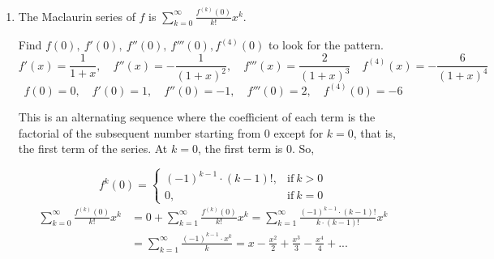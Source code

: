 \documentclass[a4paper, 12pt]{article}
\begin{document}
\begin{enumerate}[leftmargin=*,label=\textbf{\arabic*.}]
Apply integration by parts and then evaluate the improper integrals by taking the limit.
\[\left.\begin{array}{c}
u=x\implies du=dv\\[1em]
dv= e^{-x}\,dx\implies v=- e^{-x}
\end{array}\right\}\rightarrow \int u\,dv=uv-\int v\,du\]
\vspace{-1em}
\begin{align*}\int_1^{\infty}x e^{-x}\,dx&=\lim_{R\to\infty}\left[-x e^{-x}\right]_1^R-\lim_{P\to\infty}\int_1^P- e^{-x}\,dx=\lim_{R\to\infty}\left[-x e^{-x}\right]_1^R-\lim_{P\to\infty} e^{-x}\bigg|_1^P\\[1em]&=\lim_{R\to\infty}\left(-R e^{-R}+ e^{-1}\right)-\lim_{P\to\infty}\left( e^{-P}- e^{-1}\right)=\lim_{R\to\infty}\left(-R e^{-R}\right)+2 e^{-1}\end{align*}

To evaluate the limit, we assume that $-R e^{-R}$ is a function of $R$. After that, put the expression in a form that we can apply L'Hôpital's rule in order to eliminate the form $\infty/\infty$.
\[\lim_{R\to\infty}\left(-R e^{-R}\right)=\lim_{R\to\infty}\frac{-R}{\frac1{ e^{-R}}}\overset{\text{L'H.}}{=}\lim_{R\to\infty}\frac1{\frac{1}{ e^{-2R}}\cdot\left(- e^{-R}\right)}=\lim_{R\to\infty}\left(- e^{-R}\right)=0\]

Since the integral converges to $2 e^{-1}$, the series $\displaystyle\sum_{k=1}^{\infty}k e^{-k}$ also converges. The first term of the series in the original question is $0\cdot e^0=0$. The sum of a convergent series and a finite number is still finite. Therefore, the sum $\displaystyle\sum_{k=0}^{\infty}k e^{-k}$ converges.

\item The Maclaurin series of $f$ is $\displaystyle\sum_{k=0}^{\infty}\frac{f^{(k)}(0)}{k!}x^k$.

Find $f(0),\:f'(0),\:f''(0),\:f'''(0),f^{(4)}(0)$ to look for the pattern.
\[f'(x)=\frac1{1+x},\quad f''(x)=-\frac1{(1+x)^2},\quad f'''(x)=\frac2{(1+x)^3}\quad f^{(4)}(x)=-\frac6{(1+x)^4} \]
\[f(0)=0,\quad f'(0)=1,\quad f''(0)=-1,\quad f'''(0)=2,\quad f^{(4)}(0)=-6\]

This is an alternating sequence where the coefficient of each term is the factorial of the subsequent number starting from $0$ except for $k=0$, that is, the first term of the series. At $k=0$, the first term is $0$. So,

\[f^{k}(0)=\left\{\begin{array}{ll}(-1)^{k-1}\cdot (k-1)!,&\text{if}\: k>0\\0,& \text{if}\:k=0\end{array}\right.\]
\begin{align*}\sum_{k=0}^{\infty}\frac{f^{(k)}(0)}{k!}x^k&=0+\sum_{k=1}^{\infty}\frac{f^{(k)}(0)}{k!}x^k=\sum_{k=1}^{\infty}\frac{(-1)^{k-1}\cdot(k-1)!}{k\cdot(k-1)!}x^k\\[1em]&=\boxed{\sum_{k=1}^{\infty}\frac{(-1)^{k-1}\cdot x^k}{k}=x-\frac{x^2}2+\frac{x^3}3-\frac{x^4}4+...}\end{align*}


\end{enumerate}
\end{document}
